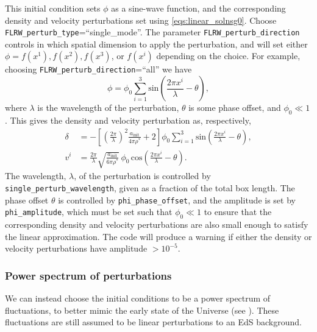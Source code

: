 This initial condition sets $\phi$ as a sine-wave function, and the corresponding density and velocity perturbations set using \eqref{eqs:linear_solnsg0}. Choose \texttt{FLRW\_perturb\_type}=``single\_mode''. The parameter \texttt{FLRW\_perturb\_direction} controls in which spatial dimension to apply the perturbation, and will set either $\phi=f(x^1),f(x^2),f(x^3)$, or $f(x^i)$ depending on the choice. For example, choosing \texttt{FLRW\_perturb\_direction}=``all'' we have
\begin{equation}\label{eq:phi}
	\phi = \phi_{0} \sum_{i=1}^{3} \mathrm{sin}\left(\frac{2\pi x^{i}}{\lambda} - \theta \right),
\end{equation}
where $\lambda$ is the wavelength of the perturbation, $\theta$ is some phase offset, and $\phi_0\ll1$. This gives the density and velocity perturbation as, respectively, \cite{macpherson2017}
\begin{align} 
	\delta &= - \left[ \left(\frac{2\pi}{\lambda}\right)^{2} \frac{a_{\mathrm{init}}}{4\pi\rho^{*}} + 2\right] \phi_{0} \sum_{i=1}^{3} \mathrm{sin}\left(\frac{2\pi x^{i}}{\lambda} - \theta \right),\label{eq:initial_delta}\\
	v^{i} &= \frac{2\pi}{\lambda}\sqrt{\frac{a_{\mathrm{init}}}{6\pi\rho^{*}}}\, \phi_{0}\, \mathrm{cos}\left(\frac{2\pi x^{i}}{\lambda} - \theta \right). \label{eq:initial_deltav}
\end{align}
The wavelength, $\lambda$, of the perturbation is controlled by \texttt{single\_perturb\_wavelength}, given as a fraction of the total box length.
 The phase offset $\theta$ is controlled by {\tt phi\_phase\_offset}, and the amplitude is set by \texttt{phi\_amplitude}, which must be set such that $\phi_0\ll1$
 to ensure that the corresponding density and velocity perturbations are also small enough to satisfy the linear approximation. The code will produce a warning if either the density or velocity perturbations have amplitude $> 10^{-5}$. 

\subsubsection{Power spectrum of perturbations}\label{sec:pspec_ics}

We can instead choose the initial conditions to be a power spectrum of fluctuations, to better mimic the early state of the Universe (see \cite{macpherson2019}). 
These fluctuations are still assumed to be linear perturbations to an EdS background. 

